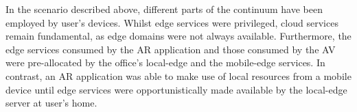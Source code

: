 In the scenario described above, different parts of the continuum have been employed by user's devices. Whilst edge services were privileged, cloud services remain fundamental, as edge domains were not always available. Furthermore, the edge services consumed by the AR application and those consumed by the AV were pre-allocated by the office's local-edge and the mobile-edge services. In contrast, an AR application was able to make use of local resources from a mobile device until edge services were opportunistically made available by the local-edge server at user's home.


